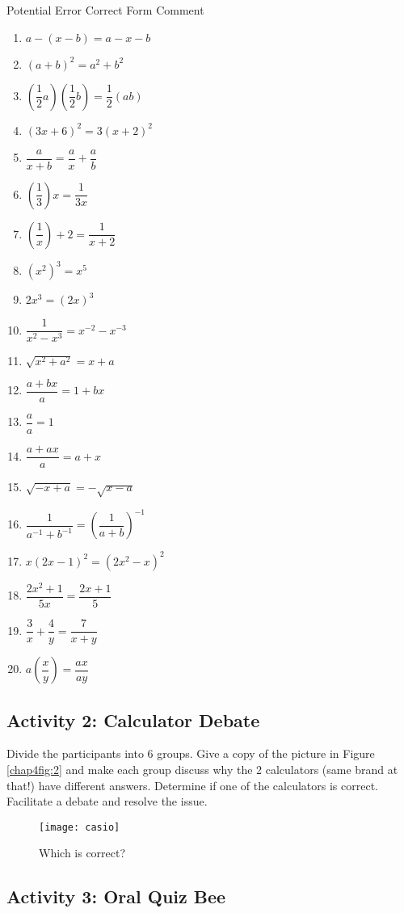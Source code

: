 Potential Error \hfil Correct Form \hfil Comment
\begin{enumerate}
\item $a-(x-b)=a-x-b$
\item $(a+b)^2=a^2+b^2$
\item $\left(\dfrac{1}{2}a\right)\left(\dfrac{1}{2}b\right)=\dfrac{1}{2}(ab)$
\item $(3x+6)^2=3(x+2)^2$
\item $\dfrac{a}{x+b}=\dfrac{a}{x}+\dfrac{a}{b}$
\item $\left(\dfrac{1}{3}\right)x=\dfrac{1}{3x}$
\item $\left(\dfrac{1}{x}\right)+2=\dfrac{1}{x+2}$
\item $(x^2)^3=x^5$
\item $2x^3=(2x)^3$
\item $\dfrac{1}{x^2-x^3}=x^{-2}-x^{-3}$
\item $\sqrt{x^2+a^2}=x+a$
\item $\dfrac{a+bx}{a}=1+bx$
\item $\dfrac{a}{a}=1$
\item $\dfrac{a+ax}{a}=a+x$
\item $\sqrt{-x+a}=-\sqrt{x-a}$
\item $\dfrac{1}{a^{-1}+b^{-1}}=\left(\dfrac{1}{a+b}\right)^{-1}$
\item $x(2x-1)^2=(2x^2-x)^2$
\item $\dfrac{2x^2+1}{5x}=\dfrac{2x+1}{5}$
\item $\dfrac{3}{x}+\dfrac{4}{y}=\dfrac{7}{x+y}$
\item $a\left(\dfrac{x}{y}\right)=\dfrac{ax}{ay}$
\end{enumerate}
\subsection*{Activity 2: Calculator Debate}
Divide the participants into 6 groups. Give a copy of the picture in Figure \eqref{chap4fig:2} and make each
group discuss why the 2 calculators (same brand at that!) have different
answers. Determine if one of the calculators is correct. Facilitate a debate and
resolve the issue.

\begin{figure}[!h]
\centering
\caption{Which is correct?}
\texttt{[image: casio]}
\label{chap4fig:2}
\end{figure}
\subsection*{Activity 3: Oral Quiz Bee}
